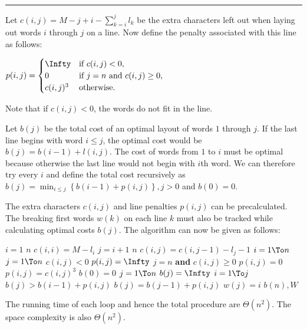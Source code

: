 \documentclass[a4paper,parskip=half]{scrartcl}
\newenvironment{solution}[1]{
\rule{\textwidth}{1pt}
\begin{description}[leftmargin=3em, style=nextline, topsep=0em,
font={\bfseries\rmfamily}]
\item[#1]
}{
\end{description}
}
\begin{document}
\begin{solution}{II-4}

Let $c(i,j) = M - j + i - \sum_{k=i}^j l_k$ be the extra characters left out
when laying out words $i$ through $j$ on a line. Now define the penalty
associated with this line as follows:

$\begin{aligned}
p(i,j) =
\begin{cases}
\Infty & \text{if } c(i,j) < 0,\\
0 & \text{if } j = n \text{ and } c(i,j) \geq 0,\\
c(i, j)^3 & \text{otherwise}.
\end{cases}
\end{aligned}$

Note that if $c(i,j) < 0$, the words do not fit in the line.

Let $b(j)$ be the total cost of an optimal layout of words $1$ through $j$.  If
the last line begins with word $i \leq j$, the optimal cost would be $b(j) =
b(i-1) + l(i,j)$. The cost of words from $1$ to $i$ must be optimal because
otherwise the last line would not begin with $i$th word. We can therefore try
every $i$ and define the total cost recursively as $b(j) = \min_{i \leq j}
\left\{ b(i-1) + p(i,j) \right\}, j > 0$ and $b(0) = 0$.

The extra characters $c(i,j)$ and line penalties $p(i,j)$ can be precalculated.
The breaking first words $w(k)$ on each line $k$  must also be tracked while
calculating optimal costs $b(j)$. The algorithm can now be given as follows:

\begin{codebox}
\li \For $i = 1$ \To $n$ \Do
\li   $c(i,i) = M - l_i$
\li   \For $j = i + 1$ \To $n$ \Do
\li     $c(i,j) = c(i,j-1) - l_j - 1$ \End \End
\li \For $i = 1 \To n$ \Do
\li   \For $j = 1 \To n$ \Do
\li     \If $c(i,j) < 0$ \Then
\li       $p(i,j) = \Infty$
\li     \ElseIf $j = n$ \textbf{and} $c(i,j) \geq 0$ \Then
\li       $p(i,j) = 0$
\li     \Else
\li       $p(i,j) = c(i,j)^3$ \End \End \End
\li $b(0) = 0$
\li \For $j = 1 \To n$ \Do
\li   $b(j) = \Infty$
\li   \For $i = 1 \To j$ \Do
\li     \If $b(j) > b(i-1) + p(i,j)$ \Then
\li       $b(j) = b(j-1) + p(i,j)$
\li       $w(j) = i$ \End \End \End
\li \Return $b(n), W$
\end{codebox}

The running time of each loop and hence the total procedure
 are $\Theta(n^2)$. The space complexity is also
$\Theta(n^2)$.


\end{solution}
\end{document}
